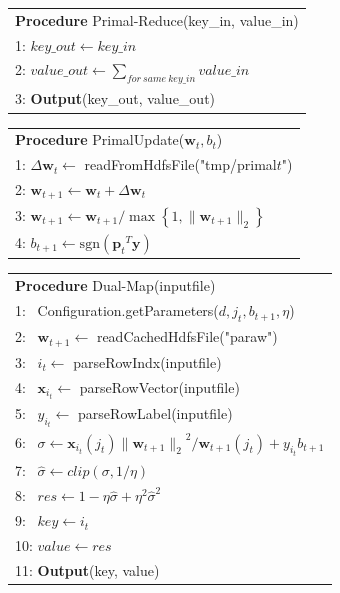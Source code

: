 \documentclass{llncs}
\newcommand{\bw}{\mathbf{w}}
\newcommand{\bp}{\mathbf{p}}
\newcommand{\lc}{\left(}
\newcommand{\rc}{\right)}
\def\sgn{\mathrm{sgn}}
\begin{document}
    \begin{table}[ht]
	\begin{tabular}{l}
	\hline\noalign{\smallskip}
	\textbf{Procedure} Primal-Reduce(key\_in, value\_in) \\
	\noalign{\smallskip}
	\hline
	\noalign{\smallskip}
    1:  $key\_out \leftarrow key\_in$ \\
    2:  $value\_out \leftarrow \sum_{for~same~key\_in}{value\_in} $ \\
    3:  \textbf{Output}(key\_out, value\_out) \\
	\hline
	\end{tabular}
	\end{table}

    \begin{table}[ht]
	\begin{tabular}{l}
	\hline\noalign{\smallskip}
	\textbf{Procedure} PrimalUpdate($\bw_t, b_t$) \\
	\noalign{\smallskip}
	\hline
	\noalign{\smallskip}
    1:  $\Delta \bw_t \leftarrow$ readFromHdfsFile("tmp/primal$t$") \\
    2:  $\bw_{t+1} \leftarrow \bw_t+\Delta \bw_t$ \\
	3:	${\bw}_{t+1}\leftarrow {\bw}_{t+1}/\max \left\{1,\|{\bw}_{t+1}\|_2 \right\}$ \\
    4:  ${b}_{t+1}\leftarrow \sgn\lc {{\bp}_{t}}^{T}\mathbf{y}\rc$ \\
	\hline
	\end{tabular}
	\end{table}

    \begin{table}[ht]
	\begin{tabular}{l}
	\hline\noalign{\smallskip}
	\textbf{Procedure} Dual-Map(inputfile) \\
	\noalign{\smallskip}
	\hline
	\noalign{\smallskip}
    1:  ~Configuration.getParameters($d, j_t, b_{t+1}, \eta$) \\
    2:  ~$\bw_{t+1} \leftarrow$ readCachedHdfsFile("paraw") \\
    3:  ~$i_t \leftarrow$ parseRowIndx(inputfile)\\
    4:  ~$\mathbf{x}_{i_t} \leftarrow$ parseRowVector(inputfile) \\
    5:  ~$y_{i_t} \leftarrow$ parseRowLabel(inputfile) \\
    6:  ~$\sigma \leftarrow \mathbf{x}_{i_t} \lc {j}_{t}\rc{\|{\bw}_{t+1}\|_2}^{2}/{\bw}_{t+1}\lc {j}_{t} \rc+{y}_{i_t}{b}_{t+1}$ \\
	7:	~$\hat{\sigma} \leftarrow clip\lc \sigma,1/\eta \rc$ \\
	8:	~$res \leftarrow 1-\eta\hat{\sigma} + {\eta}^{2}{\hat{\sigma}}^{2} $ \\
    9:  ~$key \leftarrow i_t$ \\
    10: $value \leftarrow res $ \\
    11: \textbf{Output}(key, value) \\
	\hline
	\end{tabular}
	\end{table}
\end{document}
